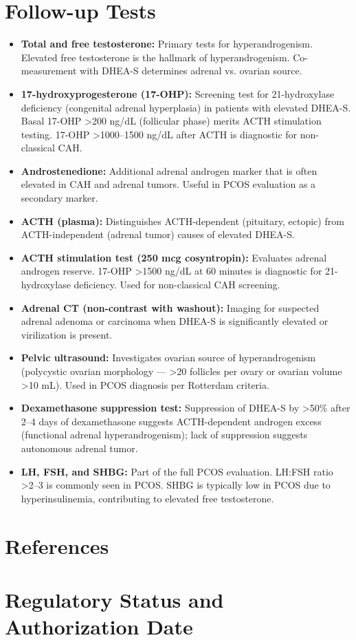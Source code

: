 \section*{Follow-up Tests}
\begin{itemize}
  \item \textbf{Total and free testosterone:} Primary tests for hyperandrogenism. Elevated free testosterone is the hallmark of hyperandrogenism. Co-measurement with DHEA-S determines adrenal vs. ovarian source.
  \item \textbf{17-hydroxyprogesterone (17-OHP):} Screening test for 21-hydroxylase deficiency (congenital adrenal hyperplasia) in patients with elevated DHEA-S. Basal 17-OHP >200 ng/dL (follicular phase) merits ACTH stimulation testing. 17-OHP >1000--1500 ng/dL after ACTH is diagnostic for non-classical CAH.
  \item \textbf{Androstenedione:} Additional adrenal androgen marker that is often elevated in CAH and adrenal tumors. Useful in PCOS evaluation as a secondary marker.
  \item \textbf{ACTH (plasma):} Distinguishes ACTH-dependent (pituitary, ectopic) from ACTH-independent (adrenal tumor) causes of elevated DHEA-S.
  \item \textbf{ACTH stimulation test (250 mcg cosyntropin):} Evaluates adrenal androgen reserve. 17-OHP >1500 ng/dL at 60 minutes is diagnostic for 21-hydroxylase deficiency. Used for non-classical CAH screening.
  \item \textbf{Adrenal CT (non-contrast with washout):} Imaging for suspected adrenal adenoma or carcinoma when DHEA-S is significantly elevated or virilization is present.
  \item \textbf{Pelvic ultrasound:} Investigates ovarian source of hyperandrogenism (polycystic ovarian morphology --- >20 follicles per ovary or ovarian volume >10 mL). Used in PCOS diagnosis per Rotterdam criteria.
  \item \textbf{Dexamethasone suppression test:} Suppression of DHEA-S by >50\% after 2--4 days of dexamethasone suggests ACTH-dependent androgen excess (functional adrenal hyperandrogenism); lack of suppression suggests autonomous adrenal tumor.
  \item \textbf{LH, FSH, and SHBG:} Part of the full PCOS evaluation. LH:FSH ratio >2--3 is commonly seen in PCOS. SHBG is typically low in PCOS due to hyperinsulinemia, contributing to elevated free testosterone.
\end{itemize}

\section*{References}



\clearpage
\section*{Regulatory Status and Authorization Date}

\clearpage
